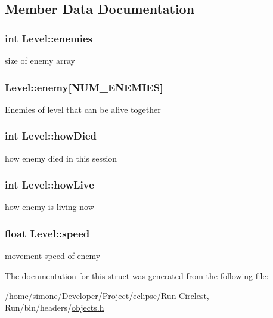 \subsection{Member Data Documentation}
\hypertarget{struct_level_a263c12b29dad8ef036f22afe3a698f71}{
\subsubsection[{enemies}]{\setlength{\rightskip}{0pt plus 5cm}int Level\-::enemies}}\label{struct_level_a263c12b29dad8ef036f22afe3a698f71}
size of enemy array \hypertarget{struct_level_abc0fd066888f1eb4ccbac8ae8db9dd59}{
\subsubsection[{enemy}]{ Level\-::enemy\mbox{[}{\bf N\-U\-M\-\_\-\-E\-N\-E\-M\-I\-E\-S}\mbox{]}}}\label{struct_level_abc0fd066888f1eb4ccbac8ae8db9dd59}
Enemies of level that can be alive together \hypertarget{struct_level_adebb63051bd8830503afe734f38dac34}{
\subsubsection[{how\-Died}]{\setlength{\rightskip}{0pt plus 5cm}int Level\-::how\-Died}}\label{struct_level_adebb63051bd8830503afe734f38dac34}
how enemy died in this session \hypertarget{struct_level_a69256998056f0c8d34e66dbf7e9340c5}{
\subsubsection[{how\-Live}]{\setlength{\rightskip}{0pt plus 5cm}int Level\-::how\-Live}}\label{struct_level_a69256998056f0c8d34e66dbf7e9340c5}
how enemy is living now \hypertarget{struct_level_a936a1d131d1e056878474ca831c5e88f}{
\subsubsection[{speed}]{\setlength{\rightskip}{0pt plus 5cm}float Level\-::speed}}\label{struct_level_a936a1d131d1e056878474ca831c5e88f}
movement speed of enemy 

The documentation for this struct was generated from the following file\-:\begin{DoxyCompactItemize}
\item 
/home/simone/\-Developer/\-Project/eclipse/\-Run Circlest, Run/bin/headers/\hyperlink{objects_8h}{objects.\-h}\end{DoxyCompactItemize}
